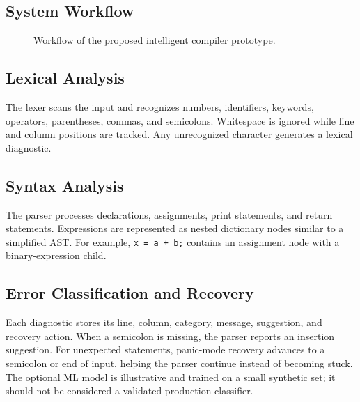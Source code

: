 \documentclass[12pt,a4paper]{article}
\begin{document}
\subsection{System Workflow}
\begin{figure}[H]
\centering
{}
\caption{Workflow of the proposed intelligent compiler prototype.}
\end{figure}

\subsection{Lexical Analysis}
The lexer scans the input and recognizes numbers, identifiers, keywords, operators, parentheses, commas, and semicolons. Whitespace is ignored while line and column positions are tracked. Any unrecognized character generates a lexical diagnostic.

\subsection{Syntax Analysis}
The parser processes declarations, assignments, print statements, and return statements. Expressions are represented as nested dictionary nodes similar to a simplified AST. For example, \texttt{x = a + b;} contains an assignment node with a binary-expression child.

\subsection{Error Classification and Recovery}
Each diagnostic stores its line, column, category, message, suggestion, and recovery action. When a semicolon is missing, the parser reports an insertion suggestion. For unexpected statements, panic-mode recovery advances to a semicolon or end of input, helping the parser continue instead of becoming stuck. The optional ML model is illustrative and trained on a small synthetic set; it should not be considered a validated production classifier.
\end{document}
